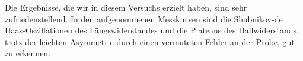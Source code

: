 



Die Ergebnisse, die wir in diesem Versuchs erzielt haben, sind sehr zufriedenstellend. In den aufgenommenen Messkurven sind die Shubnikov-de Haas-Oszillationen des Längswiderstandes und die Plateaus des Hallwiderstands, trotz der leichten Asymmetrie durch einen vermuteten Fehler an der Probe, gut zu erkennen. 

